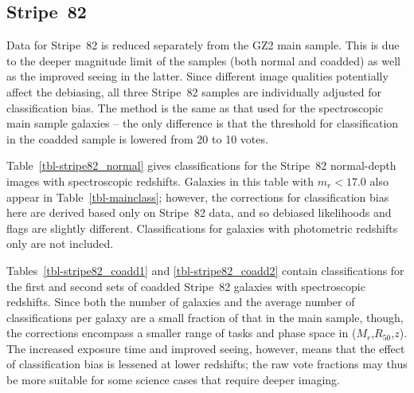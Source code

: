 \documentclass[useAMS,usenatbib]{mn2e}
\newcommand{\mr}{$M_r$}
\newcommand{\rfifty}{$R_{50}$}
\newcommand{\redshift}{$z$}
\begin{document}
\subsection{Stripe~82}\label{ssec-s82}

Data for Stripe~82 is reduced separately from the GZ2 main sample. This is due to the deeper magnitude limit of the samples (both normal and coadded) as well as the improved seeing in the latter. Since different image qualities potentially affect the debiasing, all three Stripe~82 samples are individually adjusted for classification bias. The method is the same as that used for the spectroscopic main sample galaxies -- the only difference is that the threshold for classification in the coadded sample is lowered from 20 to 10 votes. 

Table~\ref{tbl-stripe82_normal} gives classifications for the Stripe~82 normal-depth images with spectroscopic redshifts. Galaxies in this table with $m_r < 17.0$ also appear in Table~\ref{tbl-mainclass}; however, the corrections for classification bias here are derived based only on Stripe~82 data, and so debiased likelihoods and flags are slightly different. Classifications for galaxies with photometric redshifts only are not included.

Tables~\ref{tbl-stripe82_coadd1} and \ref{tbl-stripe82_coadd2} contain classifications for the first and second sets of coadded Stripe~82 galaxies with spectroscopic redshifts. Since both the number of galaxies and the average number of classifications per galaxy are a small fraction of that in the main sample, though, the corrections encompass a smaller range of tasks and phase space in (\mr,\rfifty,\redshift). The increased exposure time and improved seeing, however, means that the effect of classification bias is lessened at lower redshifts; the raw vote fractions may thus be more suitable for some science cases that require deeper imaging. 
\end{document}
